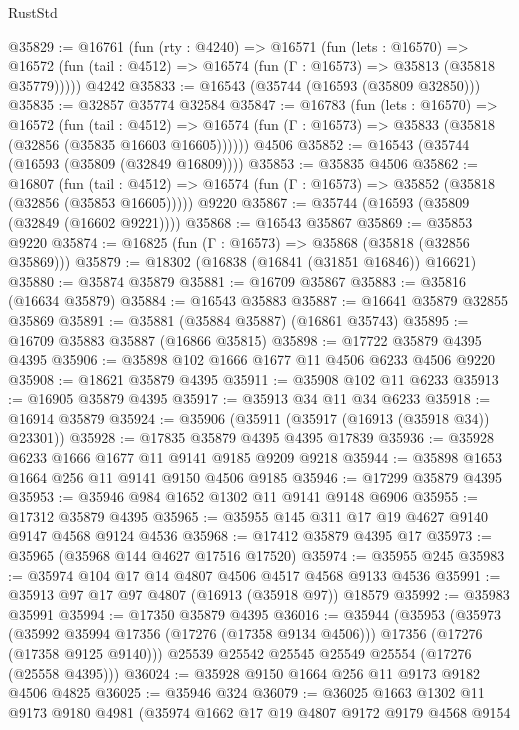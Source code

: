 \begin{lexlean}{RustStd}
\begin{coremodule}
@35829 := @16761
    (fun (rty : @4240) =>
    @16571
      (fun (lets : @16570) =>
      @16572 (fun (tail : @4512) => @16574 (fun (Γ : @16573) => @35813 (@35818 @35779)))))
    @4242
@35833 := @16543 (@35744 (@16593 (@35809 @32850)))
@35835 := @32857 @35774 @32584
@35847 := @16783
    (fun (lets : @16570) =>
    @16572
      (fun (tail : @4512) =>
      @16574 (fun (Γ : @16573) => @35833 (@35818 (@32856 (@35835 @16603 @16605))))))
    @4506
@35852 := @16543 (@35744 (@16593 (@35809 (@32849 @16809))))
@35853 := @35835 @4506
@35862 := @16807
    (fun (tail : @4512) => @16574 (fun (Γ : @16573) => @35852 (@35818 (@32856 (@35853 @16605)))))
    @9220
@35867 := @35744 (@16593 (@35809 (@32849 (@16602 @9221))))
@35868 := @16543 @35867
@35869 := @35853 @9220
@35874 := @16825 (fun (Γ : @16573) => @35868 (@35818 (@32856 @35869)))
@35879 := @18302 (@16838 (@16841 (@31851 @16846)) @16621)
@35880 := @35874 @35879
@35881 := @16709 @35867
@35883 := @35816 (@16634 @35879)
@35884 := @16543 @35883
@35887 := @16641 @35879 @32855 @35869
@35891 := @35881 (@35884 @35887) (@16861 @35743)
@35895 := @16709 @35883 @35887 (@16866 @35815)
@35898 := @17722 @35879 @4395 @4395
@35906 := @35898 @102 @1666 @1677 @11 @4506 @6233 @4506 @9220
@35908 := @18621 @35879 @4395
@35911 := @35908 @102 @11 @6233
@35913 := @16905 @35879 @4395
@35917 := @35913 @34 @11 @34 @6233
@35918 := @16914 @35879
@35924 := @35906 (@35911 (@35917 (@16913 (@35918 @34)) @23301))
@35928 := @17835 @35879 @4395 @4395 @17839
@35936 := @35928 @6233 @1666 @1677 @11 @9141 @9185 @9209 @9218
@35944 := @35898 @1653 @1664 @256 @11 @9141 @9150 @4506 @9185
@35946 := @17299 @35879 @4395
@35953 := @35946 @984 @1652 @1302 @11 @9141 @9148 @6906
@35955 := @17312 @35879 @4395
@35965 := @35955 @145 @311 @17 @19 @4627 @9140 @9147 @4568 @9124 @4536
@35968 := @17412 @35879 @4395 @17
@35973 := @35965 (@35968 @144 @4627 @17516 @17520)
@35974 := @35955 @245
@35983 := @35974 @104 @17 @14 @4807 @4506 @4517 @4568 @9133 @4536
@35991 := @35913 @97 @17 @97 @4807 (@16913 (@35918 @97)) @18579
@35992 := @35983 @35991
@35994 := @17350 @35879 @4395
@36016 := @35944
    (@35953
      (@35973
        (@35992 @35994 @17356 (@17276 (@17358 @9134 @4506)))
        @17356
        (@17276 (@17358 @9125 @9140)))
      @25539
      @25542
      @25545
      @25549
      @25554
      (@17276 (@25558 @4395)))
@36024 := @35928 @9150 @1664 @256 @11 @9173 @9182 @4506 @4825
@36025 := @35946 @324
@36079 := @36025
    @1663
    @1302
    @11
    @9173
    @9180
    @4981
    (@35974
      @1662
      @17
      @19
      @4807
      @9172
      @9179
      @4568
      @9154

\end{coremodule}
\end{lexlean}
